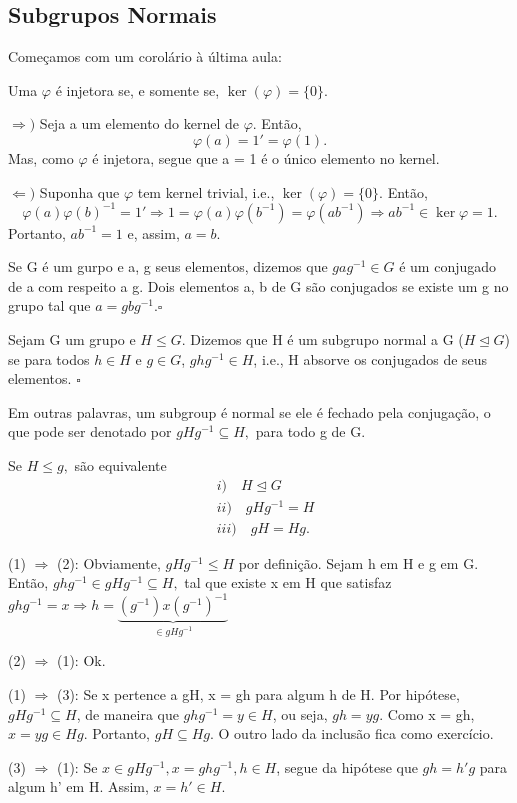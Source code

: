 \documentclass[algebra_notes.tex]{subfiles}
\begin{document}
\subsection{Subgrupos Normais}
Começamos com um corolário \`a última aula:
\begin{crl*}
	Uma $\varphi$ é injetora se, e somente se, $\ker{(\varphi)} =\{0\}.$
\end{crl*}
\begin{proof*}
	$ \Rightarrow)$ Seja a um elemento do kernel de $\varphi$. Então,
	$$
		\varphi(a) = 1' = \varphi(1).
	$$
	Mas, como $\varphi$ é injetora, segue que a = 1 é o único elemento no kernel.

	$ \Leftarrow)$ Suponha que $\varphi$ tem kernel trivial, i.e., $\ker{(\varphi)} =\{0\}.$ Então,
	$$
		\varphi(a)\varphi(b)^{-1} = 1' \Rightarrow 1 = \varphi(a)\varphi(b^{-1}) = \varphi(ab^{-1}) \Rightarrow ab^{-1}\in\ker{\varphi} = {1}.
	$$
	Portanto, $ab^{-1} = 1$ e, assim, $a = b.$ \qedsymbol
\end{proof*}
\begin{def*}
	Se G é um gurpo e a, g seus elementos, dizemos que $gag^{-1}\in G$ é um conjugado de a com respeito a g. Dois elementos a, b
	de G são conjugados se existe um g no grupo tal que $a = g b g^{-1}.\square$
\end{def*}
\begin{def*}
	Sejam G um grupo e $H\leq{G}$. Dizemos que H é um subgrupo normal a G ($H\trianglelefteq G$) se para todos $h\in H$ e $g\in G$,
	$ghg^{-1}\in H$, i.e., H absorve os conjugados de seus elementos. $\square$
\end{def*}
Em outras palavras, um subgroup é normal se ele é fechado pela conjugação, o que pode ser denotado por $gHg^{-1}\subseteq{H},$ para todo
g de G.
\begin{prop*}
	Se $H\leq{g},$ são equivalente
	\begin{align*}
		 & i)\quad H\trianglelefteq{G} \\
		 & ii)\quad gHg^{-1} = H       \\
		 & iii)\quad gH = Hg.
	\end{align*}
\end{prop*}
\begin{proof*}
	(1) $ \Rightarrow$ (2): Obviamente, $gHg^{-1}\leq{H}$ por definição. Sejam h em H e g em G. Então, $ghg^{-1}\in gHg^{-1}\subseteq{H},$
	tal que existe x em H que satisfaz $ghg^{-1} = x \Rightarrow h = \underbrace{(g^{-1})x(g^{-1})^{-1}}_{\in gHg^{-1}}$

	(2) $ \Rightarrow$ (1): Ok.

	(1) $ \Rightarrow$ (3): Se x pertence a gH, x = gh para algum h de H. Por hipótese, $gHg^{-1}\subseteq{H}$, de maneira que
	$ghg^{-1} = y\in H$, ou seja, $gh = yg.$ Como x = gh, $x = yg\in Hg$. Portanto, $gH\subseteq{Hg}.$ O outro lado da inclusão fica como exercício.

	(3) $\Rightarrow$ (1): Se $x\in gHg^{-1}, x = ghg^{-1}, h\in H$, segue da hipótese que $gh = h'g$ para algum h' em H. Assim,
	$x = h'\in H.$ \qedsymbol
\end{proof*}
\end{document}
